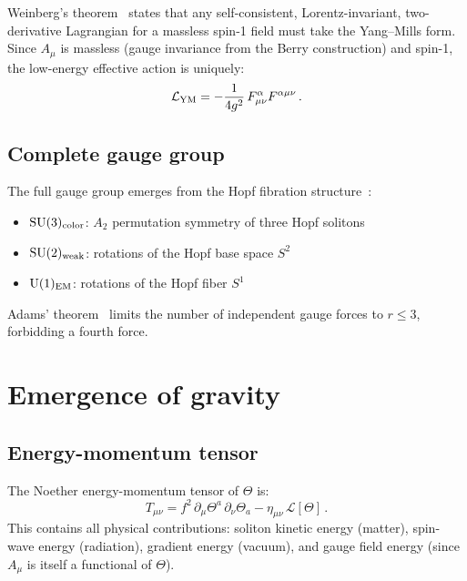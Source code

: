 \documentclass[twocolumn,preprintnumbers,amsmath,amssymb,prd]{revtex4-2}
\begin{document}
Weinberg's theorem~\cite{Weinberg1979} states that any self-consistent, Lorentz-invariant, two-derivative Lagrangian for a massless spin-1 field must take the Yang--Mills form.
Since $A_\mu$ is massless (gauge invariance from the Berry construction) and spin-1, the low-energy effective action is uniquely:
\begin{equation}
\mathcal{L}_{\rm YM} = -\frac{1}{4g^2}\,F_{\mu\nu}^\alpha F^{\alpha\mu\nu}\,.
\end{equation}

\subsection{Complete gauge group}

The full gauge group emerges from the Hopf fibration structure~\cite{Paper2}:
\begin{itemize}
\item $\mathrm{SU}(3)_{\rm color}$: $A_2$ permutation symmetry of three Hopf solitons
\item $\mathrm{SU}(2)_{\rm weak}$: rotations of the Hopf base space $S^2$
\item $\mathrm{U}(1)_{\rm EM}$: rotations of the Hopf fiber $S^1$
\end{itemize}
Adams' theorem~\cite{Adams1960} limits the number of independent gauge forces to $r \leq 3$, forbidding a fourth force.

\section{Emergence of gravity}
\label{sec:gravity}

\subsection{Energy-momentum tensor}

The Noether energy-momentum tensor of $\Theta$ is:
\begin{equation}
T_{\mu\nu} = f^2\,\partial_\mu\Theta^a\,\partial_\nu\Theta_a - \eta_{\mu\nu}\,\mathcal{L}[\Theta]\,.
\label{eq:Tmunu}
\end{equation}
This contains all physical contributions: soliton kinetic energy (matter), spin-wave energy (radiation), gradient energy (vacuum), and gauge field energy (since $A_\mu$ is itself a functional of $\Theta$).
\end{document}
